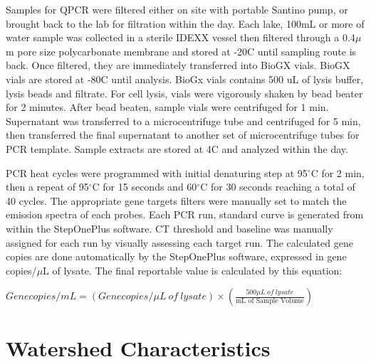 Samples for QPCR were filtered either on site with portable Santino pump, or brought back to the lab for filtration within the day.
Each lake, 100mL or more of water sample was collected in a sterile IDEXX vessel then filtered through a 0.4$\mu$m pore size polycarbonate membrane  and stored at -20C until sampling route is back. Once filtered, they are immediately transferred into BioGX vials. BioGX vials are stored at -80C until analysis. BioGx vials contains 500 uL of lysis buffer, lysis beads and filtrate. For cell lysis, vials were vigorously shaken by bead beater for 2 minutes. After bead beaten, sample vials were centrifuged for 1 min. Supernatant was transferred to a microcentrifuge tube and centrifuged for 5 min, then transferred the final supernatant to another set of microcentrifuge tubes for PCR template.  Sample extracts are stored at 4C and analyzed within the day.



PCR heat cycles were programmed with initial denaturing step at 95$^\circ$C for 2 min, then a repeat of 95$^\circ$C for 15 seconds and 60$^\circ$C for 30 seconds reaching a total of 40 cycles. The appropriate gene targets filters were manually set to match the emission spectra of each probes. Each PCR run, standard curve is generated  from within the StepOnePlus software. CT threshold and baseline was manually assigned for each run by visually assessing each target run. The calculated gene copies are done automatically by the StepOnePlus software, expressed in gene copies/$\mu$L of lysate. The final reportable value is calculated by this equation:

\begin{center}
  $Genecopies/mL = (Genecopies/\mu L \: of \: lysate) \times (\frac{500\mu L \: of \: lysate}{\text{mL of Sample Volume}})$
\end{center}





\section{Watershed Characteristics}


